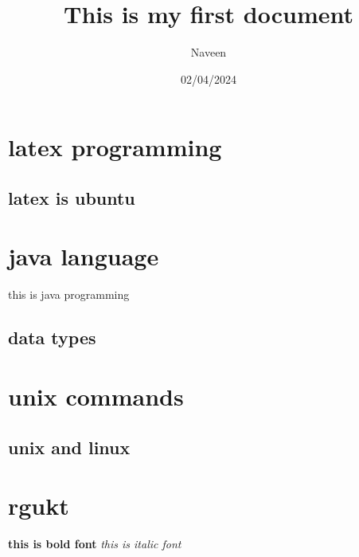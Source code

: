 \documentclass{article}
\title{This is my first document}
\author{Naveen}
\date{02/04/2024}
\begin{document}
	
	\maketitle
	
	\tableofcontents
	
	\newpage
	
	\section{latex programming} \label{sec:intro}
	\subsection{latex is ubuntu}
	   \newpage
	   
	\section{java language} \label{sec:java}
	this is java programming
	\subsection{data types}
	
	\section{unix commands}
	\subsection{unix and linux}
	
	\section{rgukt}
	
	\textbf{this is bold font}
	\textit{this is italic font}
	    
	
\end{document}
